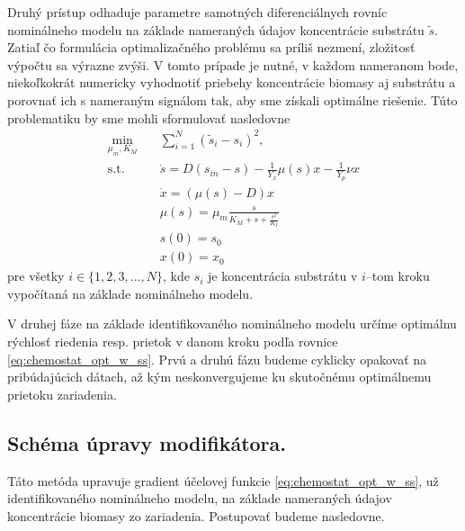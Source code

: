 Druhý prístup odhaduje parametre samotných diferenciálnych rovníc nominálneho modelu na základe nameraných údajov koncentrácie substrátu $ \tilde{s} $. Zatiaľ čo formulácia optimalizačného problému sa príliš nezmení, zložitosť výpočtu sa výrazne zvýši. V tomto prípade je nutné, v každom nameranom bode, niekoľkokrát numericky vyhodnotiť priebehy koncentrácie biomasy aj substrátu a porovnať ich s nameraným signálom  tak, aby sme získali optimálne riešenie. Túto problematiku by sme mohli sformulovať nasledovne
\begin{equation}
\label{eq:twostep_diff_pe}
	\begin{split}
		\min_{\mu_{m},K_{M}} \quad & \sum_{i=1}^{N} \left(\tilde{s}_{i}-s_{i}\right)^2, \\
		\textrm{s.t.} \quad & \dot{s} = D(s_{in}-s)-\frac{1}{Y_x}\mu(s)x-\frac{1}{Y_p}\nu x \\
		& \dot{x} = (\mu(s)-D)x \\
		& \mu(s)=\mu_{m}\frac{s}{K_{M} + s + \frac{s^2}{K_{I}}} \\
		& s(0) = s_0 \\
		& x(0) = x_0
	\end{split}
\end{equation}
pre všetky $ i \in \lbrace 1,2,3,\dots,N \rbrace $, kde $ s_{i} $ je koncentrácia substrátu v $ i $--tom kroku vypočítaná na základe nominálneho modelu.

V druhej fáze na základe identifikovaného nominálneho modelu určíme optimálnu rýchlosť riedenia resp. prietok v danom kroku podľa rovnice \eqref{eq:chemostat_opt_w_ss}. Prvú a druhú fázu budeme cyklicky opakovať na pribúdajúcich dátach, až kým neskonvergujeme ku skutočnému optimálnemu prietoku zariadenia.

\subsection*{Schéma úpravy modifikátora.}
Táto metóda upravuje gradient účelovej funkcie \eqref{eq:chemostat_opt_w_ss}, už identifikovaného nominálneho modelu, na základe nameraných údajov koncentrácie biomasy zo zariadenia. Postupovať budeme nasledovne.

